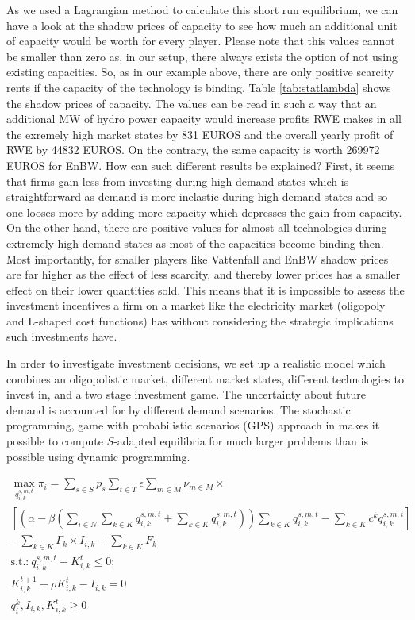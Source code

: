 As we used a Lagrangian method to calculate this short run equilibrium, we can have a look at the shadow prices of capacity to see how much an additional unit of capacity would be worth for every player. Please note that this values cannot be smaller than zero as, in our setup, there always exists the option of not using existing capacities. So, as in our example above, there are only positive scarcity rents if the capacity of the technology is binding. Table \ref{tab:statlambda} shows the shadow prices of capacity. The values can be read in such a way that an additional MW of hydro power capacity would increase profits RWE makes in all the exremely high market states by 831 EUROS and the overall yearly profit of RWE by 44832 EUROS. On the contrary, the same capacity is worth 269972 EUROS for EnBW. How can such different results be explained? First, it seems that firms gain less from investing during high demand states which is straightforward as demand is more inelastic during high demand states and so one looses more by adding more capacity which depresses the gain from capacity. On the other hand, there are positive values for almost all technologies during extremely high demand states as most of the capacities become binding then.
Most importantly, for smaller players like Vattenfall and EnBW shadow prices are far higher as the effect of less scarcity, and thereby lower prices has a smaller effect on their lower quantities sold. This means that it is impossible to assess the investment incentives a firm on a market like the electricity market (oligopoly and L-shaped cost functions) has without considering the strategic implications such investments have.


In order to investigate investment decisions, we set up a realistic model which combines an oligopolistic market, different market states, different technologies to invest in, and a two stage investment game. The uncertainty about future demand is accounted for by different demand scenarios. The stochastic programming, game with probabilistic scenarios (GPS) approach in \cite{Genc2007} makes it possible to compute $S$-adapted equilibria for much larger problems than is possible using dynamic programming.

\begin{gather}
	\max_{q_{i,k}^{s,m,t}} \pi_i=  \sum_{s\in S} p_s \sum_{t\in T} \epsilon \sum_{m\in M} \nu_{m\in M} \times \\ \nonumber 
	\left[\left(\alpha-\beta\left(\sum_{i\in N} \sum_{k\in K} q_{i,k}^{s,m,t}+\sum_{k\in K}q_{i,k}^{s,m,t}\right)\right) \sum_{k\in K} q_{i,k}^{s,m,t} - \sum_{k\in K}c^k q_{i,k}^{s,m,t} \right] \\ \nonumber 
	- \sum_{k\in K}\Gamma_k \times I_{i,k} + \sum_{k\in K} F_k \\ \nonumber
	\text{s.t.:} \  q_{i,k}^{s,m,t}-K_{i,k}^t \leq 0; \\  \nonumber
											K^{t+1}_{i,k} - \rho K_{i,k}^t - I_{i,k} = 0 \\ \nonumber
 										  q_i^k, I_{i,k}, K_{i,k}^t	\geq 0  \nonumber
	\end{gather}
	
